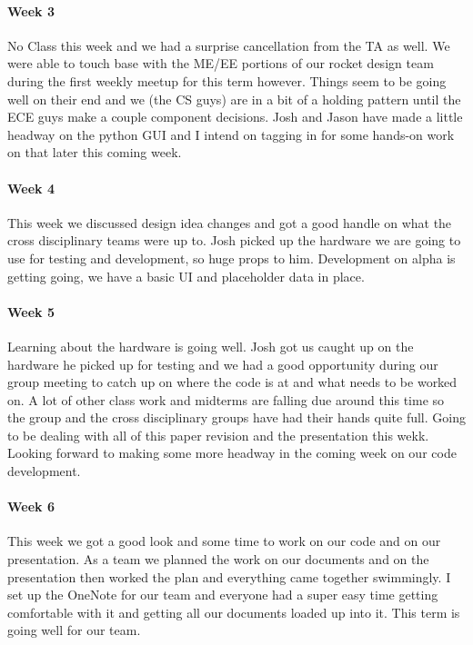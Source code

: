 \documentclass[10pt,draftclsnofoot,onecolumn,retainorgcmds]{IEEEtran}
\begin{document}
\paragraph{Week 3}
No Class this week and we had a surprise cancellation from the TA as well. We were able to touch base with the ME/EE portions of our rocket design team during the first weekly meetup for this term however. Things seem to be going well on their end and we (the CS guys) are in a bit of a holding pattern until the ECE guys make a couple component decisions. Josh and Jason have made a little headway on the python GUI and I intend on tagging in for some hands-on work on that later this coming week.\\
\paragraph{Week 4}
This week we discussed design idea changes and got a good handle on what the cross disciplinary teams were up to. Josh picked up the hardware we are going to use for testing and development, so huge props to him. Development on alpha is getting going, we have a basic UI and placeholder data in place. \\
\paragraph{Week 5}
 Learning about the hardware is going well. Josh got us caught up on the hardware he picked up for testing and we had a good opportunity during our group meeting to catch up on where the code is at and what needs to be worked on. A lot of other class work and midterms are falling due around this time so the group and the cross disciplinary groups have had their hands quite full. Going to be dealing with all of this paper revision and the presentation this wekk. Looking forward to making some more headway in the coming week on our code development.\\
\paragraph{Week 6}
 This week we got a good look and some time to work on our code and on our presentation. As a team we planned the work on our documents and on the presentation then worked the plan and everything came together swimmingly. I set up the OneNote for our team and everyone had a super easy time getting comfortable with it and getting all our documents loaded up into it. This term is going well for our team.\\
\end{document}

